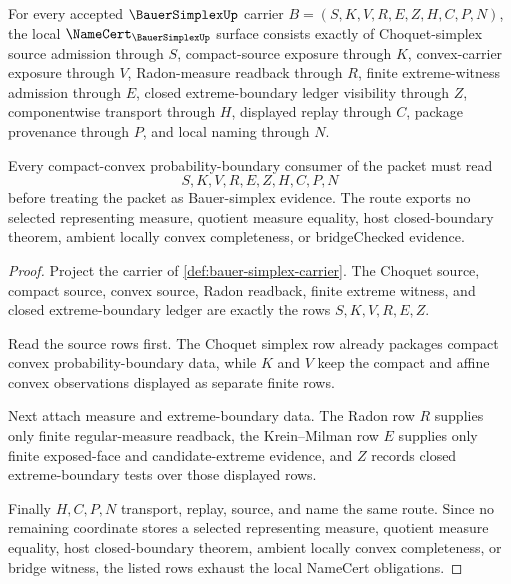 \begin{theorem}
\label{thm:bauer-simplex-namecert-obligations}
For every accepted $\BauerSimplexUp$ carrier $B=(S,K,V,R,E,Z,H,C,P,N)$, the
local $\NameCert_{\BauerSimplexUp}$ surface consists exactly of Choquet-simplex
source admission through $S$, compact-source exposure through $K$,
convex-carrier exposure through $V$, Radon-measure readback through $R$, finite
extreme-witness admission through $E$, closed extreme-boundary ledger visibility
through $Z$, componentwise transport through $H$, displayed replay through $C$,
package provenance through $P$, and local naming through $N$.

Every compact-convex probability-boundary consumer of the packet must read
$$
S,K,V,R,E,Z,H,C,P,N
$$
before treating the packet as Bauer-simplex evidence. The route exports no
selected representing measure, quotient measure equality, host closed-boundary
theorem, ambient locally convex completeness, or bridgeChecked evidence.
\end{theorem}
\begin{proof}
Project the carrier of \autoref{def:bauer-simplex-carrier}. The Choquet source,
compact source, convex source, Radon readback, finite extreme witness, and
closed extreme-boundary ledger are exactly the rows $S,K,V,R,E,Z$.

Read the source rows first. The Choquet simplex row already packages compact
convex probability-boundary data, while $K$ and $V$ keep the compact and affine
convex observations displayed as separate finite rows.

Next attach measure and extreme-boundary data. The Radon row $R$ supplies only
finite regular-measure readback, the Krein--Milman row $E$ supplies only finite
exposed-face and candidate-extreme evidence, and $Z$ records closed
extreme-boundary tests over those displayed rows.

Finally $H,C,P,N$ transport, replay, source, and name the same route. Since no
remaining coordinate stores a selected representing measure, quotient measure
equality, host closed-boundary theorem, ambient locally convex completeness, or
bridge witness, the listed rows exhaust the local NameCert obligations.
\end{proof}


